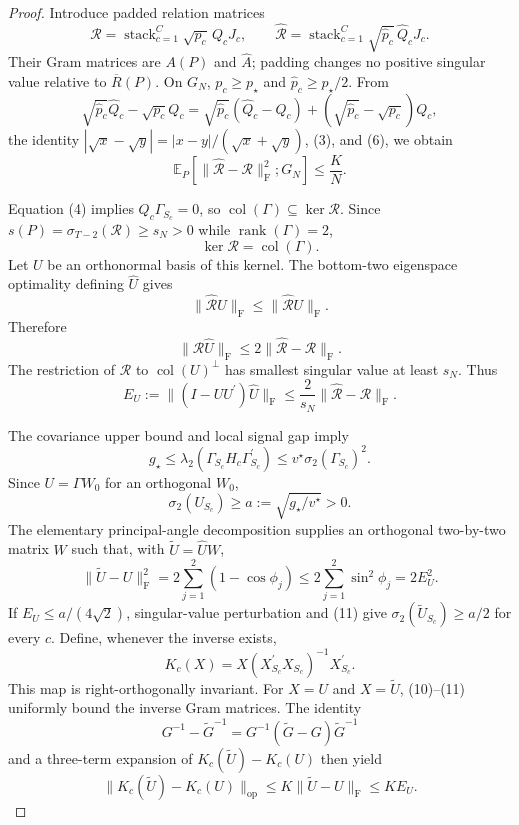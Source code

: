 \documentclass{article}
\begin{document}
\begin{proof}
Introduce padded relation matrices
\[
\mathcal R=\operatorname{stack}_{c=1}^C\sqrt{p_c}\,Q_cJ_c,
\qquad
\widehat{\mathcal R}=\operatorname{stack}_{c=1}^C
\sqrt{\widehat p_c}\,\widehat Q_cJ_c.
\]
Their Gram matrices are \(A(P)\) and \(\widehat A\); padding changes no positive singular value relative to \(\overline R(P)\). On \(G_N\), \(p_c\geq p_\star\) and \(\widehat p_c\geq p_\star/2\). From
\[
\sqrt{\widehat p_c}\widehat Q_c-\sqrt{p_c}Q_c
=\sqrt{\widehat p_c}(\widehat Q_c-Q_c)
+(\sqrt{\widehat p_c}-\sqrt{p_c})Q_c,
\]
the identity \(|\sqrt x-\sqrt y|=|x-y|/(\sqrt x+\sqrt y)\), (3), and (6), we obtain
\[
\mathbb E_P[\|\widehat{\mathcal R}-\mathcal R\|_{\mathrm F}^2;G_N]
\leq\frac K N.
\tag{7}
\]

Equation (4) implies \(Q_c\Gamma_{S_c}=0\), so \(\operatorname{col}(\Gamma)\subseteq\ker\mathcal R\). Since \(s(P)=\sigma_{T-2}(\mathcal R)\geq s_N>0\) while \(\operatorname{rank}(\Gamma)=2\),
\[
\ker\mathcal R=\operatorname{col}(\Gamma).
\tag{8}
\]
Let \(U\) be an orthonormal basis of this kernel. The bottom-two eigenspace optimality defining \(\widehat U\) gives
\[
\|\widehat{\mathcal R}\widehat U\|_{\mathrm F}
\leq\|\widehat{\mathcal R}U\|_{\mathrm F}.
\]
Therefore
\[
\|\mathcal R\widehat U\|_{\mathrm F}
\leq2\|\widehat{\mathcal R}-\mathcal R\|_{\mathrm F}.
\]
The restriction of \(\mathcal R\) to \(\operatorname{col}(U)^\perp\) has smallest singular value at least \(s_N\). Thus
\[
E_U:=\|(I-UU^{\prime})\widehat U\|_{\mathrm F}
\leq\frac{2}{s_N}\|\widehat{\mathcal R}-\mathcal R\|_{\mathrm F}.
\tag{9}
\]

The covariance upper bound and local signal gap imply
\[
g_\star
\leq\lambda_2(\Gamma_{S_c}H_c\Gamma_{S_c}^{\prime})
\leq v^{\star}\sigma_2(\Gamma_{S_c})^2.
\]
Since \(U=\Gamma W_0\) for an orthogonal \(W_0\),
\[
\sigma_2(U_{S_c})\geq a:=\sqrt{g_\star/v^{\star}}>0.
\tag{10}
\]
The elementary principal-angle decomposition supplies an orthogonal two-by-two matrix \(W\) such that, with \(\widetilde U=\widehat UW\),
\[
\|\widetilde U-U\|_{\mathrm F}^2
=2\sum_{j=1}^2(1-\cos\phi_j)
\leq2\sum_{j=1}^2\sin^2\phi_j
=2E_U^2.
\tag{11}
\]
If \(E_U\leq a/(4\sqrt2)\), singular-value perturbation and (11) give \(\sigma_2(\widetilde U_{S_c})\geq a/2\) for every \(c\). Define, whenever the inverse exists,
\[
K_c(X)=X(X_{S_c}^{\prime}X_{S_c})^{-1}X_{S_c}^{\prime}.
\]
This map is right-orthogonally invariant. For \(X=U\) and \(X=\widetilde U\), (10)--(11) uniformly bound the inverse Gram matrices. The identity
\[
G^{-1}-\widetilde G^{-1}=G^{-1}(\widetilde G-G)\widetilde G^{-1}
\]
and a three-term expansion of \(K_c(\widetilde U)-K_c(U)\) then yield
\[
\|K_c(\widetilde U)-K_c(U)\|_{\mathrm{op}}
\leq K\|\widetilde U-U\|_{\mathrm F}
\leq KE_U.
\tag{12}
\]


\end{proof}
\end{document}
